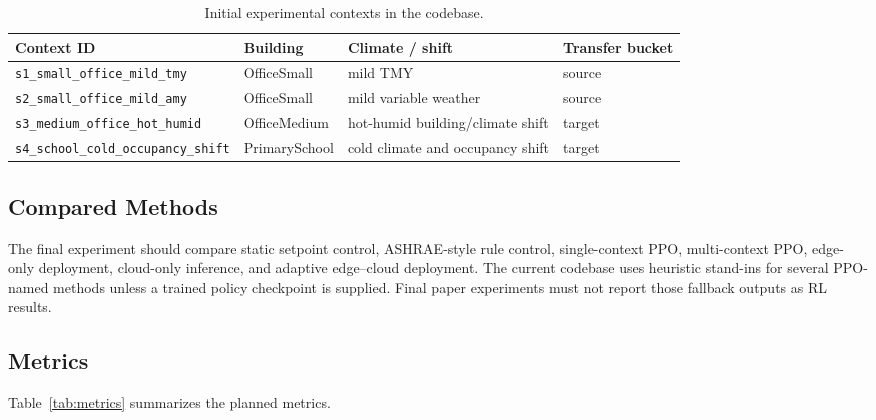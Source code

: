 \documentclass[11pt,a4paper]{article}
\begin{document}
\begin{table}[ht]
\centering
\caption{Initial experimental contexts in the codebase.}
\label{tab:contexts}
\begin{tabularx}{\textwidth}{lYYY}
\toprule
Context ID & Building & Climate / shift & Transfer bucket \\
\midrule
\texttt{s1\_small\_office\_mild\_tmy} & OfficeSmall & mild TMY & source \\
\texttt{s2\_small\_office\_mild\_amy} & OfficeSmall & mild variable weather & source \\
\texttt{s3\_medium\_office\_hot\_humid} & OfficeMedium & hot-humid building/climate shift & target \\
\texttt{s4\_school\_cold\_occupancy\_shift} & PrimarySchool & cold climate and occupancy shift & target \\
\bottomrule
\end{tabularx}
\end{table}

\subsection{Compared Methods}

The final experiment should compare static setpoint control, ASHRAE-style rule control, single-context PPO, multi-context PPO, edge-only deployment, cloud-only inference, and adaptive edge--cloud deployment. The current codebase uses heuristic stand-ins for several PPO-named methods unless a trained policy checkpoint is supplied. Final paper experiments must not report those fallback outputs as RL results.

\subsection{Metrics}

Table~\ref{tab:metrics} summarizes the planned metrics.
\end{document}
